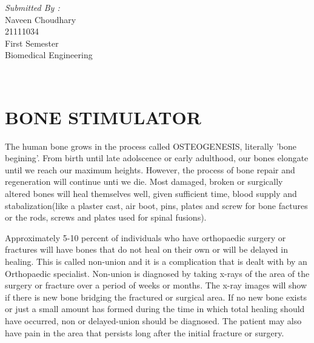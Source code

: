 \documentclass[12pt]{article}
\begin{document}
\begin{titlepage}
\begin{minipage}{0.4\textwidth}
			\begin{flushright} \large
			\emph{Submitted By :} \\
			Naveen Choudhary\\
            21111034\\
        First Semester\\
        Biomedical Engineering\\
		\end{flushright}
        
	\end{minipage}\\[2 cm]
	
	
    
    
    
    
	
\end{titlepage}



\section{BONE STIMULATOR}

The human bone grows in the process called OSTEOGENESIS, literally 'bone begining'. From birth until late adolscence or early adulthood, our bones elongate until we reach our maximum heights. However, the process of bone repair and regeneration will continue unti we die. Most damaged, broken or surgically altered bones will  heal themselves well, given sufficient time, blood supply and stabalization(like a plaster cast, air boot, pins, plates and screw for bone factures or the rods, screws and plates used for spinal fusions). 

\indent

Approximately 5-10 percent of individuals who have orthopaedic surgery or fractures will have bones that do not heal on their own or will be delayed in healing.  This is called non-union and it is a complication that is dealt with by an Orthopaedic specialist.  Non-union is diagnosed by taking x-rays of the area of the surgery or fracture over a period of weeks or months.  The x-ray images will show if there is new bone bridging the fractured or surgical area. If no new bone exists or just a small amount has formed during the time in which total healing should have occurred, non or delayed-union should be diagnosed. The patient may also have pain in the area that persists long after the initial fracture or surgery.

\indent
\end{document}
